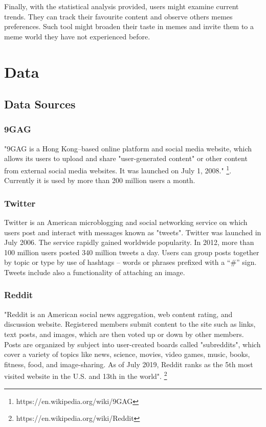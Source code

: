 \documentclass{article}
\begin{document}
Finally, with the statistical analysis provided, users might examine current trends. They can track their favourite content and observe others memes preferences. Such tool might broaden their taste in memes and invite them to a meme world they have not experienced before. 


\section{Data}
\subsection{Data Sources}
\subsubsection{9GAG}
"9GAG is a Hong Kong–based online platform and social media website, which allows its users to upload and share "user-generated content" or other content from external social media websites. It was launched on July 1, 2008." \footnote{https://en.wikipedia.org/wiki/9GAG}. Currently it is used by more than 200 million users a month.


\subsubsection{Twitter}
Twitter is an American microblogging and social networking service on which users post and interact with messages known as "tweets". Twitter was launched in July 2006. The service rapidly gained worldwide popularity. In 2012, more than 100 million users posted 340 million tweets a day. Users can group posts together by topic or type by use of hashtags – words or phrases prefixed with a “\#” sign. Tweets include also a functionality of attaching an image.

\subsubsection{Reddit}
"Reddit  is an American social news aggregation, web content rating, and discussion website. Registered members submit content to the site such as links, text posts, and images, which are then voted up or down by other members. Posts are organized by subject into user-created boards called "subreddits", which cover a variety of topics like news, science, movies, video games, music, books, fitness, food, and image-sharing. As of July 2019, Reddit ranks as the 5th most visited website in the U.S. and 13th in the world". \footnote{https://en.wikipedia.org/wiki/Reddit}
\end{document}
